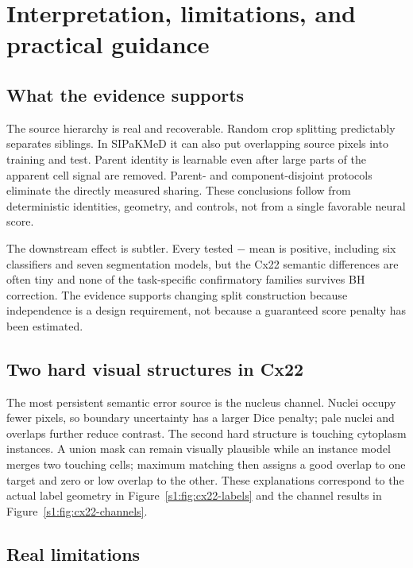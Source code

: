 \chapter{Interpretation, limitations, and practical guidance}\label{s1:ch:ch15_interpretation_limitations_and_practical}

\section{What the evidence supports}

The source hierarchy is real and recoverable. Random crop splitting predictably separates siblings. In SIPaKMeD it can also put overlapping source pixels into training and test. Parent identity is learnable even after large parts of the apparent cell signal are removed. Parent- and component-disjoint protocols eliminate the directly measured sharing. These conclusions follow from deterministic identities, geometry, and controls, not from a single favorable neural score.

The downstream effect is subtler. Every tested $-$ mean is positive, including six classifiers and seven segmentation models, but the Cx22 semantic differences are often tiny and none of the task-specific confirmatory families survives BH correction. The evidence supports changing split construction because independence is a design requirement, not because a guaranteed score penalty has been estimated.

\section{Two hard visual structures in Cx22}

The most persistent semantic error source is the nucleus channel. Nuclei occupy fewer pixels, so boundary uncertainty has a larger Dice penalty; pale nuclei and overlaps further reduce contrast. The second hard structure is touching cytoplasm instances. A union mask can remain visually plausible while an instance model merges two touching cells; maximum matching then assigns a good overlap to one target and zero or low overlap to the other. These explanations correspond to the actual label geometry in Figure~\ref{s1:fig:cx22-labels} and the channel results in Figure~\ref{s1:fig:cx22-channels}.

\section{Real limitations}

